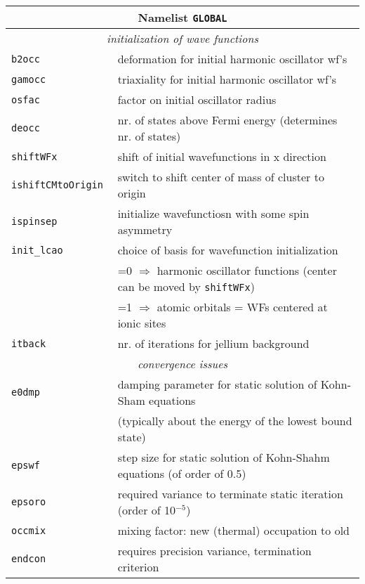 \documentclass[12pt]{article}
\begin{document}
\begin{tabular}{ll}
\hline
\multicolumn{2}{c}{Namelist {\tt GLOBAL}} in {\tt for005.<name>} \\
\hline
\multicolumn{2}{c}{\it initialization of wave functions} \\
\hline
{\tt b2occ            }& deformation for initial harmonic oscillator wf's\\
{\tt gamocc           }& triaxiality for initial harmonic oscillator wf's\\
{\tt osfac} & factor on initial oscillator radius  \\
{\tt deocc            }& nr. of states above Fermi energy (determines nr. of
states)\\
{\tt shiftWFx         }& shift of initial wavefunctions in x direction \\
{\tt ishiftCMtoOrigin }& switch to shift center of mass of cluster to origin\\
{\tt ispinsep         }& initialize wavefunctiosn with some spin asymmetry\\
{\tt init\_lcao       }& choice of basis for wavefunction initialization \\
& =0 $\Longrightarrow$ harmonic oscillator functions (center can be
moved
  by {\tt shiftWFx})
\\
& =1 $\Longrightarrow$ atomic orbitals = WFs centered at ionic sites
\\
{\tt itback} &  nr. of iterations for jellium background \\
\hline
\multicolumn{2}{c}{\it convergence issues} \\
\hline
{\tt e0dmp            }& damping parameter for static solution of Kohn-Sham equations\\
& (typically about the energy of the lowest bound state)\\
{\tt epswf            }& step size for static solution of Kohn-Shahm
equations (of order of 0.5)\\
{\tt epsoro           }& required variance to terminate static iteration (order of 10$^{-5}$)\\
{\tt occmix} &  mixing factor: new (thermal) occupation to old \\
{\tt endcon} &  requires precision variance, termination criterion \\
\hline
\end{tabular}
\end{document}
